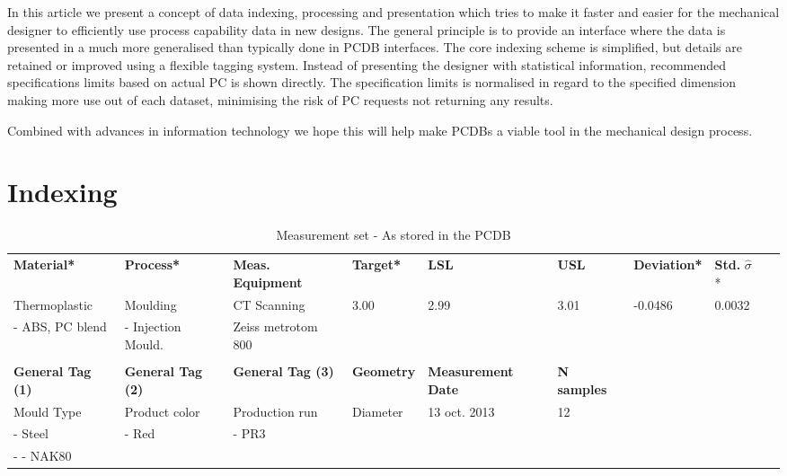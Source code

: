 \documentclass[aip,amsmath, reprint, author-year]{revtex4-1}
\begin{document}
In this article we present a concept of data indexing, processing and presentation which tries to make it faster and easier for the mechanical designer to efficiently use process capability data in new designs. 
The general principle is to provide an interface where the data is presented in a much more generalised than typically done in PCDB interfaces. 
The core indexing scheme is simplified, but details are retained or improved using a flexible tagging system. 
Instead of presenting the designer with statistical information, recommended specifications limits based on actual PC is shown directly. 
The specification limits is normalised in regard to the specified dimension making more use out of each dataset, minimising the risk of PC requests not returning any results. 

Combined with advances in information technology we hope this will help make PCDBs a viable tool in the mechanical design process. 

\section{Indexing}

\begingroup
\squeezetable

\begin{table}
\begin{ruledtabular}
\caption{\label{tab:sampleset} Measurement set - As stored in the PCDB}
\begin{tabular}{lllllllll}
\textbf{Material*} 		& \textbf{Process*} 		& \textbf{Meas. Equipment}  	& \textbf{Target*} 	& \textbf{LSL} 	& \textbf{USL} 	& \textbf{Deviation*} 	& \textbf{Std.}   $\hat{\sigma}$ * & 	\\
Thermoplastic 			& Moulding			& CT Scanning				& 3.00			& 2.99		& 3.01		& -0.0486			& 0.0032				\\
 - ABS, PC blend		& - Injection Mould.		& Zeiss metrotom 800	\\
\\
\textbf{General Tag (1)} 	& \textbf{General Tag (2)} & \textbf{General Tag (3)} 	& \textbf{Geometry}		& \textbf{Measurement Date} 	& \textbf{N samples} 	\\
Mould Type			& Product color			& Production run			& Diameter				& 13 oct. 2013  			& 12\\
- Steel 				& - Red				& - PR3				\\
- - NAK80 
\end{tabular}%
\end{ruledtabular}
\end{table}
\endgroup
\end{document}
